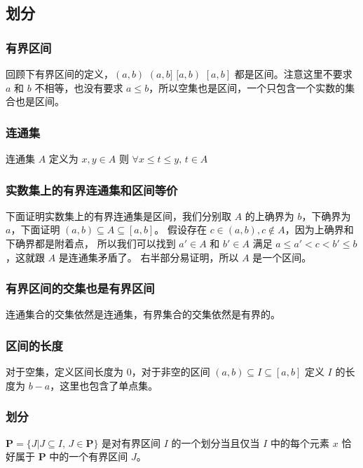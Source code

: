 \subsection{划分}

\subsubsection{有界区间}

回顾下有界区间的定义，$(a,b) \,\, (a,b] \,\, [a,b) \,\, [a,b]$ 都是区间。注意这里不要求 $a$ 和 $b$ 不相等，也没有要求 $a \le b$，所以空集也是区间，一个只包含一个实数的集合也是区间。

\subsubsection{连通集}

连通集 $A$ 定义为 $x, y \in A$ 则 $\forall x \le t \le y, \, t \in A$ 

\subsubsection{实数集上的有界连通集和区间等价}

下面证明实数集上的有界连通集是区间，我们分别取 $A$ 的上确界为 $b$，下确界为 $a$，下面证明 $(a,b) \subseteq A \subseteq [a,b]$。
假设存在 $c \in (a,b), c \notin A$，因为上确界和下确界都是附着点，
所以我们可以找到 $a' \in A $ 和 $b' \in A$ 满足 $a \le a' < c < b' \le b$，这就跟 $A$ 是连通集矛盾了。
右半部分易证明，所以 $A$ 是一个区间。

\subsubsection{有界区间的交集也是有界区间}

连通集合的交集依然是连通集，有界集合的交集依然是有界的。


\subsubsection{区间的长度}

对于空集，定义区间长度为 $0$，对于非空的区间 $(a,b) \subseteq I \subseteq [a,b]$ 定义 $I$ 的长度为 $b-a$，这里也包含了单点集。

\subsubsection{划分}

$\mathbf{P} = \{ J \vert J \subseteq I,\, J \in \mathbf{P} \}$ 是对有界区间 $I$ 的一个划分当且仅当 $I$ 中的每个元素 $x$ 恰好属于 $\mathbf{P}$ 中的一个有界区间 $J$。


